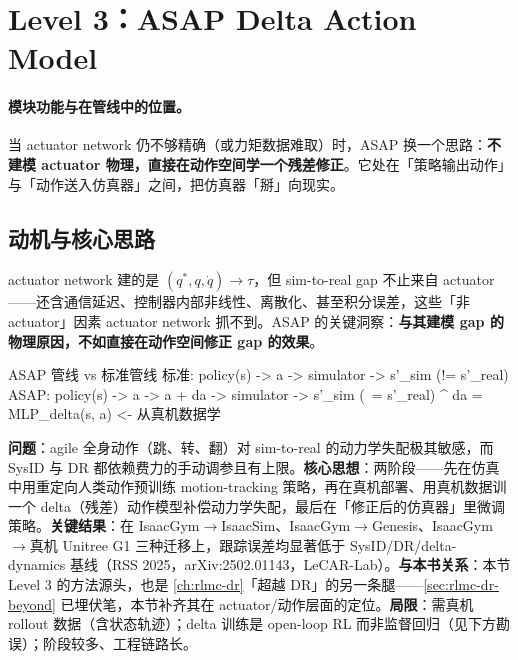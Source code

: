 \section{Level 3：ASAP Delta Action Model}
\label{sec:rlmc-act-delta}

\paragraph{模块功能与在管线中的位置。}当 actuator network 仍不够精确（或力矩数据难取）时，ASAP 换一个思路：\textbf{不建模 actuator 物理，直接在动作空间学一个残差修正}。它处在「策略输出动作」与「动作送入仿真器」之间，把仿真器「掰」向现实。

\subsection{动机与核心思路}
\label{sec:rlmc-act-delta-motivation}

actuator network 建的是 $(q^*,q,\dot q)\to\tau$，但 sim-to-real gap 不止来自 actuator——还含通信延迟、控制器内部非线性、离散化、甚至积分误差，这些「非 actuator」因素 actuator network 抓不到。ASAP 的关键洞察：\textbf{与其建模 gap 的物理原因，不如直接在动作空间修正 gap 的效果}。

\begin{codebox}{ASAP 管线 vs 标准管线}
标准:  policy(s) -> a -> simulator -> s'_sim   (!=  s'_real)
ASAP:  policy(s) -> a -> a + da -> simulator -> s'_sim  (~= s'_real)
                          ^  da = MLP_delta(s, a)  <- 从真机数据学
\end{codebox}

\begin{paper}\label{paper:rlmc-act-asap}
\textbf{问题}：agile 全身动作（跳、转、翻）对 sim-to-real 的动力学失配极其敏感，而 SysID 与 DR 都依赖费力的手动调参且有上限。\textbf{核心思想}：两阶段——先在仿真中用重定向人类动作预训练 motion-tracking 策略，再在真机部署、用真机数据训一个 delta（残差）动作模型补偿动力学失配，最后在「修正后的仿真器」里微调策略。\textbf{关键结果}：在 IsaacGym$\to$IsaacSim、IsaacGym$\to$Genesis、IsaacGym$\to$真机 Unitree G1 三种迁移上，跟踪误差均显著低于 SysID/DR/delta-dynamics 基线（RSS 2025，arXiv:2502.01143，LeCAR-Lab）\cite{he2025asap}。\textbf{与本书关系}：本节 Level 3 的方法源头，也是 \cref{ch:rlmc-dr}「超越 DR」的另一条腿——\cref{sec:rlmc-dr-beyond} 已埋伏笔，本节补齐其在 actuator/动作层面的定位。\textbf{局限}：需真机 rollout 数据（含状态轨迹）；delta 训练是 open-loop RL 而非监督回归（见下方勘误）；阶段较多、工程链路长。
\end{paper}

